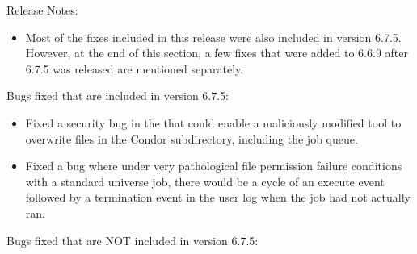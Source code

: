 \noindent Release Notes:

\begin{itemize}

\item Most of the fixes included in this release were also included in
  version 6.7.5.
  However, at the end of this section, a few fixes that were added to
  6.6.9 after 6.7.5 was released are mentioned separately.

\end{itemize}

%
%
%

\noindent Bugs fixed that are included in version 6.7.5:

\begin{itemize}

\item Fixed a security bug in the  that could enable a
maliciously modified  tool to overwrite files in the Condor
 subdirectory, including the job queue.

\item Fixed a bug where under very pathological file permission failure
conditions with a standard universe job, there would be a cycle of an
execute event followed by a termination event in the user log when the
job had not actually ran.


\end{itemize}

\noindent Bugs fixed that are NOT included in version 6.7.5:

